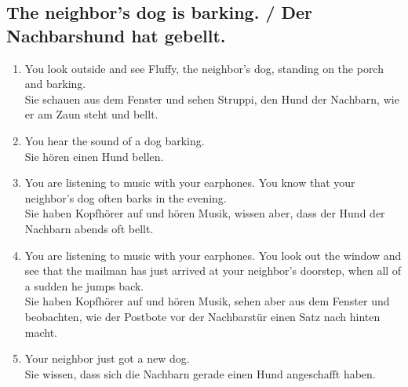 \documentclass[11pt]{article}
\begin{document}
\subsection{The neighbor's dog is barking. / Der Nachbarshund hat gebellt.}

\begin{enumerate}
	\item You look outside and see Fluffy, the neighbor's dog, standing on the porch and barking.\\
	Sie schauen aus dem Fenster und sehen Struppi, den Hund der Nachbarn, wie er am Zaun steht und bellt.
	\item You hear the sound of a dog barking.\\
	Sie hören einen Hund bellen.
	\item You are listening to music with your earphones. You know that your neighbor's dog often barks in the evening.\\
	Sie haben Kopfhörer auf und hören Musik, wissen aber, dass der Hund der Nachbarn abends oft bellt.
	\item You are listening to music with your earphones. You look out the window and see that the mailman has just arrived at your neighbor's doorstep, when all of a sudden he jumps back.\\
	Sie haben Kopfhörer auf und hören Musik, sehen aber aus dem Fenster und beobachten, wie der Postbote vor der Nachbarstür einen Satz nach hinten macht.
	\item Your neighbor just got a new dog.\\
	Sie wissen, dass sich die Nachbarn gerade einen Hund angeschafft haben.
\end{enumerate}
\end{document}
